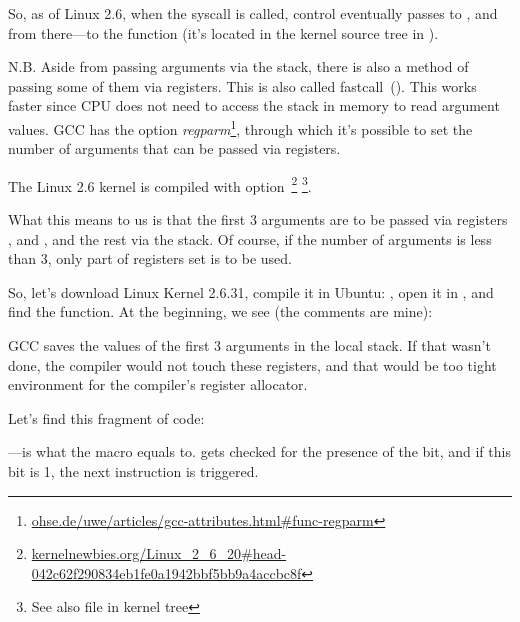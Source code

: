 So, as of Linux 2.6, when the  syscall is called, control eventually passes to ,
and from there---to the  function (it's located in the kernel source tree in ).

\newcommand{\URLREGPARM}{\href{http://www.ohse.de/uwe/articles/gcc-attributes.html\#func-regparm}{ohse.de/uwe/articles/gcc-attributes.html\#func-regparm}}

\label{regparm}
N.B.  Aside from passing arguments via the stack,
there is also a method of passing some of them
via registers. This is also called fastcall~().
This works faster since CPU does not need to access the stack in memory to read argument values.
GCC has the option \emph{regparm}\footnote{\URLREGPARM},
through which it's possible to set the number of arguments that can be passed via registers.

\newcommand{\URLKERNELNEWB}{\href{http://kernelnewbies.org/Linux_2_6_20\#head-042c62f290834eb1fe0a1942bbf5bb9a4accbc8f}{kernelnewbies.org/Linux\_2\_6\_20\#head-042c62f290834eb1fe0a1942bbf5bb9a4accbc8f}}
\newcommand{\CALLINGHFILE}{arch/x86/include/asm/calling.h}

The Linux 2.6 kernel is compiled with  option~\footnote{\URLKERNELNEWB}
\footnote{See also \TT{\CALLINGHFILE} file in kernel tree}.

What this means to us is that the first 3 arguments are to be passed via registers \EAX, \EDX and \ECX, 
and the rest via the stack. 
Of course, if the number of arguments is less than 3, only part of registers set is to be used.

So, let's download Linux Kernel 2.6.31, compile it in Ubuntu: , open it in \IDA, 
and find the  function. At the beginning, we see (the comments are mine):



GCC saves the values of the first 3 arguments in the local stack. 
If that wasn't done, the compiler would not touch these registers, 
and that would be too tight environment for the compiler's \gls{register allocator}.

Let's find this fragment of code:



---is what the  macro equals to.
 gets checked for the presence of the  bit, and if this bit is 1, 
the next \JNZ instruction is triggered.

